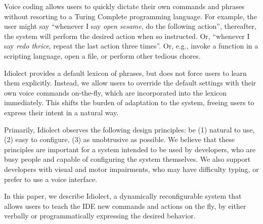 \documentclass[conference]{IEEEtran}
\begin{document}

Voice coding allows users to quickly dictate their own commands and phrases without resorting to a Turing Complete programming language. For example, the user might say ``whenever I say \textit{open sesame}, do the following action'', thereafter, the system will perform the desired action when so instructed. Or, ``whenever I say \textit{redo thrice}, repeat the last action three times''. Or, e.g., invoke a function in a scripting language, open a file, or perform other tedious chores.

Idiolect provides a default lexicon of phrases, but does not force users to learn them explicitly. Instead, we allow users to override the default settings with their own voice commands on-the-fly, which are incorporated into the lexicon immediately. This shifts the burden of adaptation to the system, freeing users to express their intent in a natural way.

Primarily, Idiolect observes the following design principles: be (1) natural to use, (2) easy to configure, (3) as unobtrusive as possible. We believe that these principles are important for a system intended to be used by developers, who are busy people and capable of configuring the system themselves. We also support developers with visual and motor impairments, who may have difficulty typing, or prefer to use a voice interface.

In this paper, we describe Idiolect, a dynamically reconfigurable system that allows users to teach the IDE new commands and actions on the fly, by either verbally or programmatically expressing the desired behavior.

\end{document}
